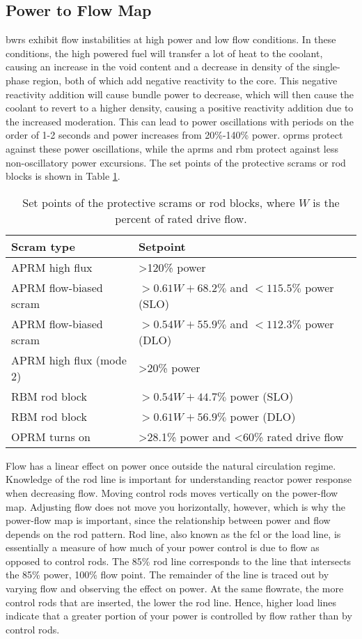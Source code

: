 \documentclass[10pt]{article}
\begin{document}
\subsection{Power to Flow Map}
\gls{bwr}s exhibit flow instabilities at high power and low flow conditions. In these conditions, the high powered fuel will transfer a lot of heat to the coolant, causing an increase in the void content and a decrease in density of the single-phase region, both of which add negative reactivity to the core. This negative reactivity addition will cause bundle power to decrease, which will then cause the coolant to revert to a higher density, causing a positive reactivity addition due to the increased moderation. This can lead to power oscillations with periods on the order of 1-2 seconds and power increases from 20\%-140\% power. \gls{oprm}s protect against these power oscillations, while the \gls{aprm}s and \gls{rbm} protect against less non-oscillatory power excursions. The set points of the protective scrams or rod blocks is shown in Table \ref{table:1}.

\begin{table}[h]
\caption{Set points of the protective scrams or rod blocks, where \(W\) is the percent of rated drive flow.}
\centering
\begin{tabular}{l l}
\hline\hline
Scram type & Setpoint\\ [0.5ex]
\hline
APRM high flux 				& \textgreater 120\% power\\
APRM flow-biased scram 	& \(> 0.61W+68.2\%\) and \(< 115.5\%\) power (SLO)\\
APRM flow-biased scram 	& \(> 0.54W+55.9\%\) and \(< 112.3\%\) power (DLO)\\
APRM high flux (mode 2)	& \textgreater 20\% power\\
RBM rod block					& \(> 0.54W+44.7\%\) power (SLO)\\
RBM rod block					& \(> 0.61W+56.9\%\) power (DLO)\\
OPRM turns on					& \textgreater 28.1\% power and \textless 60\% rated drive flow\\
\hline
\end{tabular}
\label{table:1}
\end{table}

Flow has a linear effect on power once outside the natural circulation regime. Knowledge of the rod line is important for understanding reactor power response when decreasing flow. Moving control rods moves vertically on the power-flow map. Adjusting flow does not move you horizontally, however, which is why the power-flow map is important, since the relationship between power and flow depends on the rod pattern. Rod line, also known as the \gls{fcl} or the load line, is essentially a measure of how much of your power control is due to flow as opposed to control rods. The 85\% rod line corresponds to the line that intersects the 85\% power, 100\% flow point. The remainder of the line is traced out by varying flow and observing the effect on power. At the same flowrate, the more control rods that are inserted, the lower the rod line. Hence, higher load lines indicate that a greater portion of your power is controlled by flow rather than by control rods. 
\end{document}
